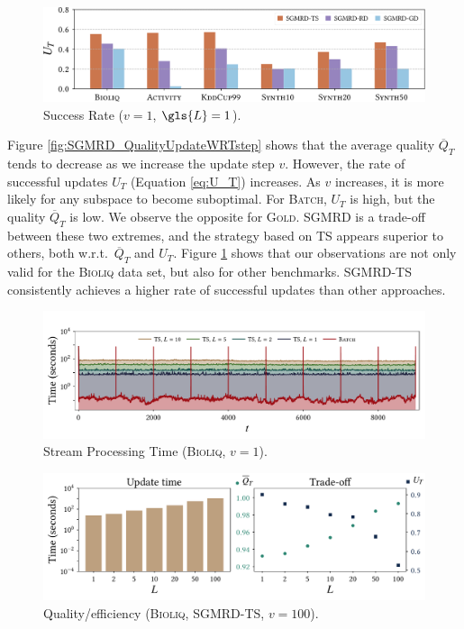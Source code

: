 \begin{figure}
	\includegraphics[width=\linewidth]{part4-figures/successratio-crop-compressed.pdf}
	\caption{Success Rate ($v = 1$, $\gls{L}=1$).} 
	\label{fig:SGMRD_SuccessRatio}
\end{figure} 

Figure \ref{fig:SGMRD_QualityUpdateWRTstep} shows that the average quality $\overline{Q}_{{T}}$ tends to decrease as we increase the update step $v$. However, the rate of successful updates $U_{{T}}$ (Equation \ref{eq:U_T}) increases. As $v$ increases, it is more likely for any subspace to become suboptimal. 
For \textsc{Batch}, $U_{{T}}$ is high, but the quality $\overline{Q}_{{T}}$ is low. 
We observe the opposite for \textsc{Gold}. %
\gls{SGMRD} is a trade-off between these two extremes, and the strategy based on \acrfull{TS} appears superior to others, both w.r.t.\ $\overline{Q}_{{T}}$ and $U_{{T}}$. Figure \ref{fig:SGMRD_SuccessRatio} shows that our observations are not only valid for the \textsc{Bioliq} data set, but also for other benchmarks. \textsc{\gls{SGMRD}-\gls{TS}} consistently achieves a higher rate of successful updates than other approaches.  

\begin{figure}
	\includegraphics[width=\linewidth]{part4-figures/stream_runtime_S_b_2-compressed.pdf}
	\caption{Stream Processing Time (\textsc{Bioliq}, $v = 1$).}
	\label{fig:SGMRD_StreamProcessing}
\end{figure}

\begin{figure}
	\includegraphics[width=\linewidth]{part4-figures/runtime_tradeoff_2-compressed.pdf}
	\caption{Quality/efficiency (\textsc{Bioliq}, \textsc{\gls{SGMRD}-\acrshort{TS}}, $v = 100$).} 
	\label{fig:SGMRD_Runtime}
\end{figure} 

